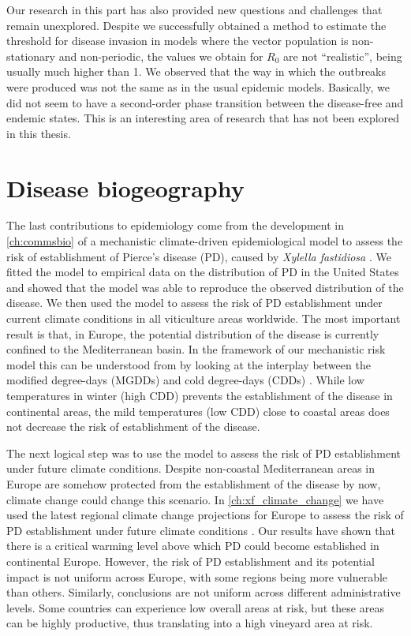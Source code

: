 Our research in this part has also provided new questions and challenges that
remain unexplored. Despite we successfully obtained a method to estimate the
threshold for disease invasion in models where the vector population is
non-stationary and non-periodic, the values we obtain for $R_0$ are not
``realistic'', being usually much higher than 1. We observed that the way in
which the outbreaks were produced was not the same as in the usual epidemic
models. Basically, we did not seem to have a second-order phase transition
between the disease-free and endemic states. This is an interesting area of
research that has not been explored in this thesis.

\section{Disease biogeography}

The last contributions to epidemiology come from the development in
\cref{ch:commsbio} of a mechanistic climate-driven epidemiological model to
assess the risk of establishment of Pierce's disease (PD), caused by
\textit{Xylella fastidiosa} \cite{GimenezRomero2022_CommsBio}. We fitted the
model to empirical data on the distribution of PD in the United States and
showed that the model was able to reproduce the observed distribution of the
disease. We then used the model to assess the risk of PD establishment under
current climate conditions in all viticulture areas worldwide. The most
important result is that, in Europe, the potential distribution of the disease
is currently confined to the Mediterranean basin. In the framework of our
mechanistic risk model this can be understood from by looking at the interplay
between the modified degree-days (MGDDs) and cold degree-days (CDDs)
\cite{GimenezRomero2022_CommsBio}. While low temperatures in winter (high CDD)
prevents the establishment of the disease in continental areas, the mild
temperatures (low CDD) close to coastal areas does not decrease the risk of
establishment of the disease.

The next logical step was to use the model to assess the risk of PD
establishment under future climate conditions. Despite non-coastal
Mediterranean areas in Europe are somehow protected from the establishment of
the disease by now, climate change could change this scenario. In
\cref{ch:xf_climate_change} we have used the latest regional climate change
projections for Europe to assess the risk of PD establishment under future
climate conditions \cite{GimenezRomero2023_PD}.
Our results have shown that there is a critical warming level above which PD
could become established in continental Europe. However, the risk of PD
establishment and its potential impact is not uniform across Europe, with some
regions being more vulnerable than others. Similarly, conclusions are not
uniform across different administrative levels. Some countries can experience
low overall areas at risk, but these areas can be highly productive, thus
translating into a high vineyard area at risk.

